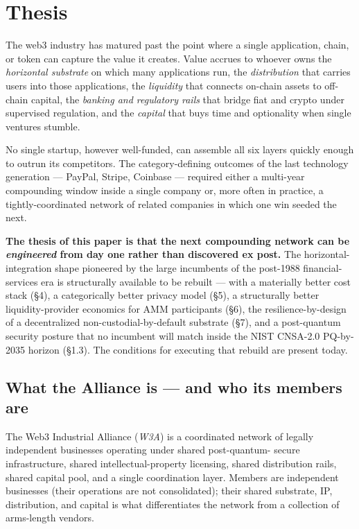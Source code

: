 \section{Thesis}

The web3 industry has matured past the point where a single application,
chain, or token can capture the value it creates. Value accrues to
whoever owns the \emph{horizontal substrate} on which many applications
run, the \emph{distribution} that carries users into those applications,
the \emph{liquidity} that connects on-chain assets to off-chain capital,
the \emph{banking and regulatory rails} that bridge fiat and crypto
under supervised regulation, and the \emph{capital} that buys time and
optionality when single ventures stumble.

No single startup, however well-funded, can assemble all six layers
quickly enough to outrun its competitors. The category-defining outcomes
of the last technology generation --- PayPal, Stripe, Coinbase ---
required either a multi-year compounding window inside a single company
or, more often in practice, a tightly-coordinated network of related
companies in which one win seeded the next.

\textbf{The thesis of this paper is that the next compounding network
can be \emph{engineered} from day one rather than discovered ex post.}
The horizontal-integration shape pioneered by the large incumbents of
the post-1988 financial-services era is structurally available to be
rebuilt --- with a materially better cost stack (\S 4), a categorically
better privacy model (\S 5), a structurally better liquidity-provider
economics for AMM participants (\S 6), the resilience-by-design of a
decentralized non-custodial-by-default substrate (\S 7), and a
post-quantum security posture that no incumbent will match inside the
NIST CNSA-2.0 PQ-by-2035 horizon (\S 1.3). The conditions for executing
that rebuild are present today.

\subsection{What the Alliance is --- and who its members are}

The Web3 Industrial Alliance (\emph{W3A}) is a coordinated network of
legally independent businesses operating under shared post-quantum-
secure infrastructure, shared intellectual-property licensing, shared
distribution rails, shared capital pool, and a single coordination
layer. Members are independent businesses (their operations are not
consolidated); their shared substrate, IP, distribution, and capital is
what differentiates the network from a collection of arms-length
vendors.


